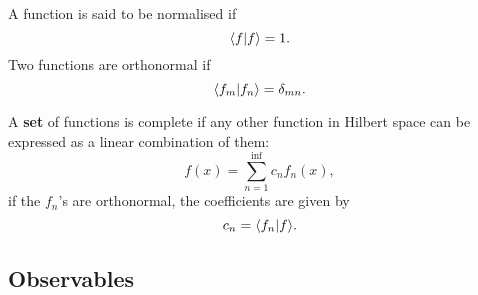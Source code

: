 \begin{defi}[Orthonormality]
A function is said to be normalised if
\begin{equation}
\langle f|f\rangle=1.
\end{equation}
Two functions are orthonormal if 
\begin{equation}
\langle f_m|f_n\rangle=\delta_{mn}.
\end{equation}
\end{defi}
\begin{defi}[Completeness]
A \textbf{set} of functions is complete if any other function in Hilbert space can be expressed as a linear combination of them: 
\begin{equation}
f(x)=\sum_{n=1}^{\inf}c_nf_n(x),
\end{equation}
if the $f_n$'s are orthonormal, the coefficients are given by 
\begin{equation}
c_n=\langle f_n|f\rangle.
\end{equation}
\end{defi}
\subsection{Observables}
